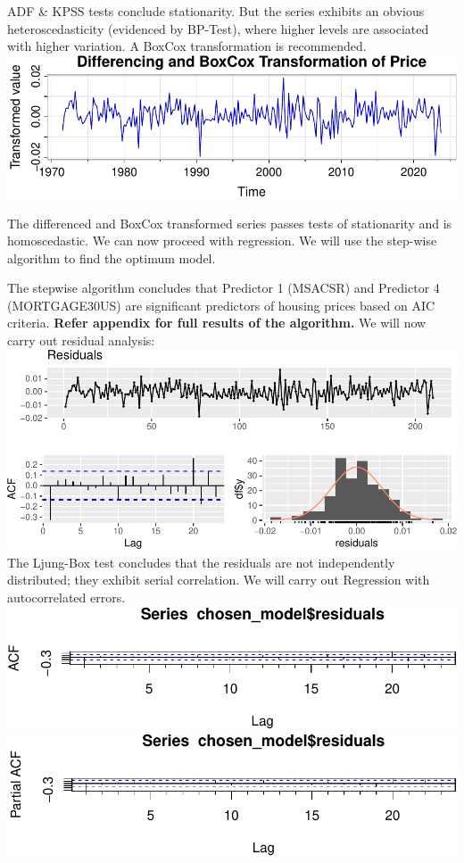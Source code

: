 \documentclass[
  man]{apa6}
\begin{document}
ADF \& KPSS tests conclude stationarity. But the series exhibits an obvious heteroscedasticity (evidenced by BP-Test), where higher levels are associated with higher variation. A BoxCox transformation is recommended.
\includegraphics{STAT429Report_files/figure-latex/unnamed-chunk-9-1.pdf}

The differenced and BoxCox transformed series passes tests of stationarity and is homoscedastic. We can now proceed with regression. We will use the step-wise algorithm to find the optimum model.

The stepwise algorithm concludes that Predictor 1 (MSACSR) and Predictor 4 (MORTGAGE30US) are significant predictors of housing prices based on AIC criteria. \textbf{Refer appendix for full results of the algorithm.} We will now carry out residual analysis:
\includegraphics{STAT429Report_files/figure-latex/unnamed-chunk-11-1.pdf}
The Ljung-Box test concludes that the residuals are not independently distributed; they exhibit serial correlation. We will carry out Regression with autocorrelated errors.
\includegraphics{STAT429Report_files/figure-latex/unnamed-chunk-12-1.pdf}
\includegraphics{STAT429Report_files/figure-latex/unnamed-chunk-13-1.pdf}
\end{document}

